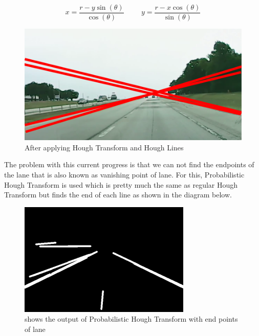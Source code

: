 \begin{equation}
    x = \frac{r - y\sin(\theta)}{\cos(\theta)} \hspace{1cm} y = \frac{r - x
    \cos(\theta)}{\sin(\theta)}
\end{equation}

\begin{figure}[H]
\begin{center}
    \includegraphics[scale=0.6]{img/lane7.png}
\end{center}
\caption{After applying Hough Transform and Hough Lines}
\label{fig:lane7}
\end{figure}

The problem with this current progress is that we can not find the endpoints of the lane that is also known as vanishing point of lane. For this, Probabilistic Hough Transform \cite{lane4} is used which is pretty much the same as regular Hough Transform but finds the end of each line as shown in the diagram below.


\begin{figure}[H]
\begin{center}
    \includegraphics[scale=0.6]{img/lane8.png}
\end{center}
\caption{shows the output of Probabilistic Hough Transform with end points of lane}
\label{fig:lane8}
\end{figure}

